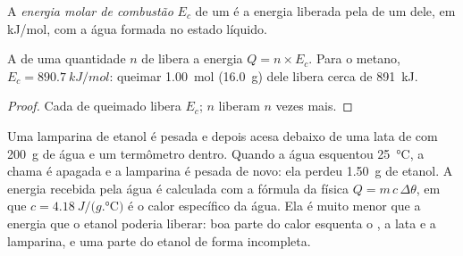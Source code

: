 \begin{definition}\label{def:g11:reaction-energy:combustion-energy}
A \emph{energia molar de combustão}
$E_c$ de um  é a energia liberada pela  de
um  dele, em \si{kJ/mol}, com a água formada no estado líquido.
\end{definition}

\begin{proposition}\label{prop:g11:reaction-energy:n-moles}
A  de uma quantidade $n$ de  libera a
energia $Q = n \times E_c$. Para o metano, $E_c = \qty{890.7}{kJ/mol}$:
queimar \qty{1.00}{mol} (\qty{16.0}{g}) dele libera cerca de
\qty{891}{kJ}.
\end{proposition}

\begin{proof}
Cada  de  queimado libera $E_c$; $n$  liberam $n$
vezes mais.
\end{proof}

\begin{inthelab}
Uma lamparina de etanol é pesada e depois acesa debaixo de uma lata de
 com \qty{200}{g} de água e um termômetro dentro. Quando a água
esquentou \qty{25}{\celsius}, a chama é apagada e a lamparina é pesada de
novo: ela perdeu \qty{1.50}{g} de etanol. A energia recebida pela água é
calculada com a fórmula da física $Q = m\, c\, \Delta\theta$, em que
$c = \qty{4.18}{J/(g.\celsius)}$ é o calor específico da água. Ela é
muito menor que a energia que o etanol poderia liberar: boa parte do
calor esquenta o , a lata e a lamparina, e uma parte do etanol 
de forma incompleta.
\end{inthelab}

